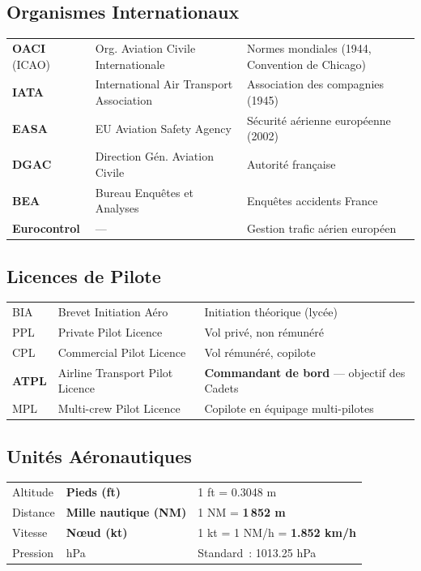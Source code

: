 \documentclass[11pt,a4paper]{article}
\begin{document}
\subsection{Organismes Internationaux}

\begin{tabular}{p{2.5cm}p{6cm}p{6cm}}
\toprule
\textbf{OACI} (ICAO) & Org. Aviation Civile Internationale & Normes mondiales (1944, Convention de Chicago) \\
\textbf{IATA} & International Air Transport Association & Association des compagnies (1945) \\
\textbf{EASA} & EU Aviation Safety Agency & Sécurité aérienne européenne (2002) \\
\textbf{DGAC} & Direction Gén. Aviation Civile & Autorité française \\
\textbf{BEA} & Bureau Enquêtes et Analyses & Enquêtes accidents France \\
\textbf{Eurocontrol} & --- & Gestion trafic aérien européen \\
\bottomrule
\end{tabular}

\subsection{Licences de Pilote}

\begin{tabular}{p{2cm}p{5cm}p{7.5cm}}
\toprule
BIA & Brevet Initiation Aéro & Initiation théorique (lycée) \\
PPL & Private Pilot Licence & Vol privé, non rémunéré \\
CPL & Commercial Pilot Licence & Vol rémunéré, copilote \\
\rowcolor{aflight}
\textbf{ATPL} & Airline Transport Pilot Licence & \textbf{Commandant de bord} --- objectif des Cadets \\
MPL & Multi-crew Pilot Licence & Copilote en équipage multi-pilotes \\
\bottomrule
\end{tabular}

\subsection{Unités Aéronautiques}

\begin{tabular}{p{3cm}p{4cm}p{7.5cm}}
\toprule
Altitude & \textbf{Pieds (ft)} & 1 ft = 0.3048 m \\
Distance & \textbf{Mille nautique (NM)} & 1 NM = \textbf{1\,852 m} \\
Vitesse & \textbf{N\oe ud (kt)} & 1 kt = 1 NM/h = \textbf{1.852 km/h} \\
Pression & hPa & Standard~: 1013.25 hPa \\
\bottomrule
\end{tabular}
\end{document}
